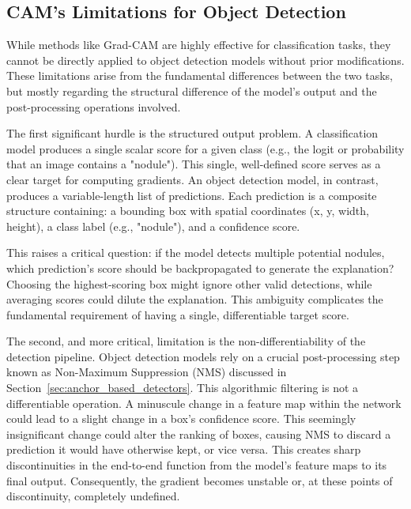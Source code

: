 
\subsection{CAM's Limitations for Object Detection}
While methods like Grad-CAM are highly effective for classification tasks, they cannot be directly applied to object detection models without prior modifications. These limitations arise from the fundamental differences between the two tasks, but mostly regarding the structural difference of the model's output and the post-processing operations involved.

The first significant hurdle is the structured output problem. A classification model produces a single scalar score for a given class (e.g., the logit or probability that an image contains a "nodule"). This single, well-defined score serves as a clear target for computing gradients. An object detection model, in contrast, produces a variable-length list of predictions. Each prediction is a composite structure containing: a bounding box with spatial coordinates (x, y, width, height), a class label (e.g., "nodule"), and a confidence score.

This raises a critical question: if the model detects multiple potential nodules, which prediction's score should be backpropagated to generate the explanation? Choosing the highest-scoring box might ignore other valid detections, while averaging scores could dilute the explanation. This ambiguity complicates the fundamental requirement of having a single, differentiable target score.

The second, and more critical, limitation is the non-differentiability of the detection pipeline. Object detection models rely on a crucial post-processing step known as Non-Maximum Suppression (NMS) discussed in Section~\ref{sec:anchor_based_detectors}.
This algorithmic filtering is not a differentiable operation. A minuscule change in a feature map within the network could lead to a slight change in a box's confidence score. This seemingly insignificant change could alter the ranking of boxes, causing NMS to discard a prediction it would have otherwise kept, or vice versa. This creates sharp discontinuities in the end-to-end function from the model's feature maps to its final output. Consequently, the gradient becomes unstable or, at these points of discontinuity, completely undefined.

